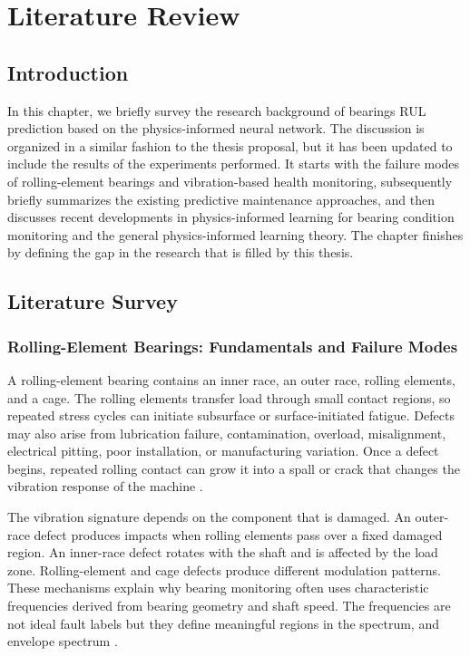 \chapter{Literature Review}
\label{chapter:literature}

\section{Introduction}

In this chapter, we briefly survey the research background of bearings RUL prediction based on the physics-informed neural network. The discussion is organized in a similar fashion to the thesis proposal, but it has been updated to include the results of the experiments performed. It starts with the failure modes of rolling-element bearings and vibration-based health monitoring, subsequently briefly summarizes the existing predictive maintenance approaches, and then discusses recent developments in physics-informed learning for bearing condition monitoring and the general physics-informed learning theory. The chapter finishes by defining the gap in the research that is filled by this thesis.

\section{Literature Survey}

\subsection{Rolling-Element Bearings: Fundamentals and Failure Modes}

A rolling-element bearing contains an inner race, an outer race, rolling elements, and a cage. The rolling elements transfer load through small contact regions, so repeated stress cycles can initiate subsurface or surface-initiated fatigue. Defects may also arise from lubrication failure, contamination, overload, misalignment, electrical pitting, poor installation, or manufacturing variation. Once a defect begins, repeated rolling contact can grow it into a spall or crack that changes the vibration response of the machine \cite{rycerz2017,sadeghi2009,xu2023}.

The vibration signature depends on the component that is damaged. An outer-race defect produces impacts when rolling elements pass over a fixed damaged region. An inner-race defect rotates with the shaft and is affected by the load zone. Rolling-element and cage defects produce different modulation patterns. These mechanisms explain why bearing monitoring often uses characteristic frequencies derived from bearing geometry and shaft speed. The frequencies are not ideal fault labels but they define meaningful regions in the spectrum, and envelope spectrum \cite{li2000,wu2022}.

